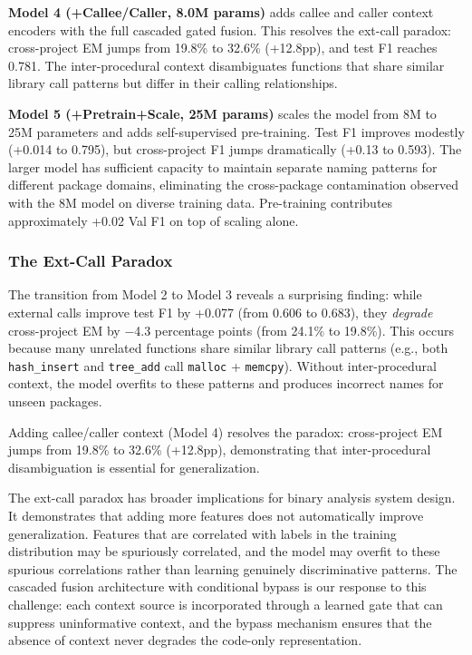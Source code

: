\documentclass[sigconf,nonacm]{acmart}
\begin{document}
\textbf{Model 4 (+Callee/Caller, 8.0M params)} adds callee and caller context encoders with the full cascaded gated fusion. This resolves the ext-call paradox: cross-project EM jumps from 19.8\% to 32.6\% (+12.8pp), and test F1 reaches 0.781. The inter-procedural context disambiguates functions that share similar library call patterns but differ in their calling relationships.

\textbf{Model 5 (+Pretrain+Scale, 25M params)} scales the model from 8M to 25M parameters and adds self-supervised pre-training. Test F1 improves modestly (+0.014 to 0.795), but cross-project F1 jumps dramatically (+0.13 to 0.593). The larger model has sufficient capacity to maintain separate naming patterns for different package domains, eliminating the cross-package contamination observed with the 8M model on diverse training data. Pre-training contributes approximately +0.02 Val F1 on top of scaling alone.

\subsubsection{The Ext-Call Paradox}
The transition from Model 2 to Model 3 reveals a surprising finding: while external calls improve test F1 by +0.077 (from 0.606 to 0.683), they \emph{degrade} cross-project EM by $-$4.3 percentage points (from 24.1\% to 19.8\%). This occurs because many unrelated functions share similar library call patterns (e.g., both \texttt{hash\_insert} and \texttt{tree\_add} call \texttt{malloc} + \texttt{memcpy}). Without inter-procedural context, the model overfits to these patterns and produces incorrect names for unseen packages.

Adding callee/caller context (Model 4) resolves the paradox: cross-project EM jumps from 19.8\% to 32.6\% (+12.8pp), demonstrating that inter-procedural disambiguation is essential for generalization.

The ext-call paradox has broader implications for binary analysis system design. It demonstrates that adding more features does not automatically improve generalization. Features that are correlated with labels in the training distribution may be spuriously correlated, and the model may overfit to these spurious correlations rather than learning genuinely discriminative patterns. The cascaded fusion architecture with conditional bypass is our response to this challenge: each context source is incorporated through a learned gate that can suppress uninformative context, and the bypass mechanism ensures that the absence of context never degrades the code-only representation.
\end{document}
